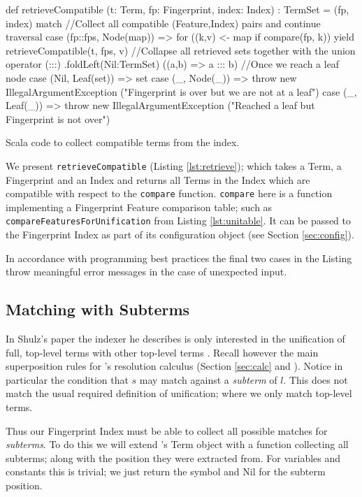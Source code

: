 \begin{listing}[H]
\begin{scalacode}
def retrieveCompatible
  (t: Term, fp: Fingerprint, index: Index) : TermSet =
  (fp, index) match {
//Collect all compatible (Feature,Index) pairs and continue traversal
    case (fp::fps, Node(map)) => 
        {for ((k,v) <- map if compare(fp, k))
            yield retrieveCompatible(t, fps, v)}
//Collapse all retrieved sets together with the union operator (:::)
        .foldLeft(Nil:TermSet) ((a,b) => a ::: b)
//Once we reach a leaf node 
    case (Nil, Leaf(set)) => set
    case (_, Node(_)) => throw new IllegalArgumentException
         ("Fingerprint is over but we are not at a leaf")
    case (_, Leaf(_)) => throw new IllegalArgumentException
         ("Reached a leaf but Fingerprint is not over")
  }
\end{scalacode}
\caption{Scala code to collect compatible terms from the index.}
\label{lst:retrieve}
\end{listing}

We present \verb!retrieveCompatible! (Listing \ref{lst:retrieve}); which takes
a Term, a Fingerprint and an Index and returns all Terms in the Index which
are compatible with respect to the \verb!compare! function.
\verb!compare! here is a function implementing a Fingerprint Feature comparison
table; such as \verb!compareFeaturesForUnification! from Listing \ref{lst:unitable}. It can be passed to the Fingerprint Index as part of its configuration
object (see Section \ref{sec:config}).

In accordance with programming best practices the final two cases in the Listing
throw meaningful error messages in the case of unexpected input.

\subsection{Matching with Subterms}

In Shulz's paper the indexer he describes is only interested in
the unification of full, top-level terms with other top-level terms \cite{shulz12}.
Recall however the main superposition rules for \beagle's resolution calculus (Section \ref{sec:calc} and \cite{baum13}).
Notice in particular the condition that $s$ may match against a \emph{subterm}
of $l$. This does not match the usual required definition of unification; where
we only match top-level terms.

Thus our Fingerprint Index must be able to collect all possible matches for \emph{subterms}.
To do this we will extend \beagle's Term object with a function collecting all
subterms; along with the position they were extracted from. For variables and constants
this is trivial; we just return the symbol and Nil for the subterm position.

